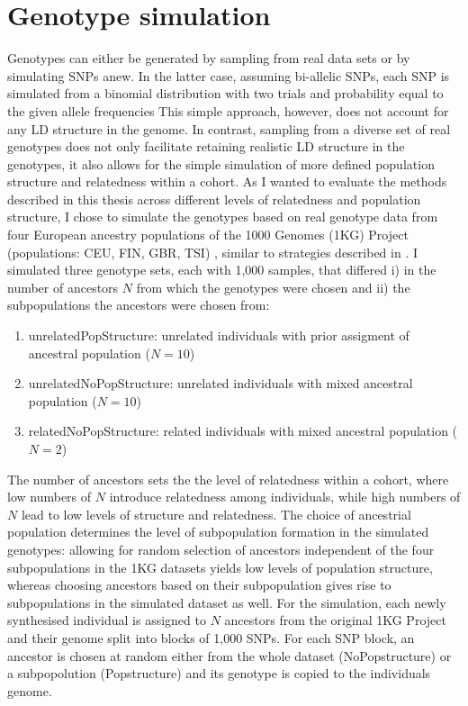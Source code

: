 \section{Genotype simulation}
\label{section:genotype-simulation}
Genotypes can either be generated by sampling from real data sets or by simulating SNPs anew. In the latter case, assuming bi-allelic SNPs, each SNP is simulated from a binomial distribution with two trials and probability equal to the given allele frequencies  This simple approach, however, does not account for any LD structure in the genome. In contrast, sampling from a diverse set of real genotypes does not only facilitate retaining realistic LD structure in the genotypes, it also allows for the simple simulation of more defined population structure and relatedness within a cohort. As I wanted to evaluate the methods described in this thesis across different levels of relatedness and population structure, 
I chose to simulate the genotypes based on real genotype data from four European ancestry populations of the 1000 Genomes (1KG) Project (populations: CEU, FIN, GBR, TSI) \citep{Abecasis2012}, similar to strategies described in \citep{Loh2014,Casale2015}. I simulated three genotype sets, each with 1,000 samples, that differed i) in the number of ancestors \(N\) from which the genotypes were chosen and ii) the subpopulations the ancestors were chosen from:
\begin{enumerate}
\item unrelatedPopStructure: unrelated individuals with prior assigment of ancestral population  (\(N=10\))
\item unrelatedNoPopStructure: unrelated individuals with mixed ancestral population  (\(N=10\))
\item relatedNoPopStructure: related individuals with mixed ancestral population (\(N=2\))
\end{enumerate}

The number of ancestors sets the the level of relatedness within a cohort, where low numbers of \(N\) introduce relatedness among individuals, while high numbers of \(N\) lead to low levels of structure and relatedness. The choice of ancestrial population determines the level of subpopulation formation in the simulated genotypes: allowing for random selection of ancestors independent of the four subpopulations in the 1KG datasets yields low levels of population structure, whereas choosing ancestors based on their subpopulation gives rise to subpopulations in the simulated dataset as well. 
For the simulation, each newly synthesised individual is assigned to \(N\) ancestors from the original 1KG Project and their genome split into blocks of 1,000 SNPs. For each SNP block, an ancestor is chosen at random either from the whole dataset (NoPopstructure) or a subpopolution (Popstructure)  and its genotype is copied to the individuals genome. 

